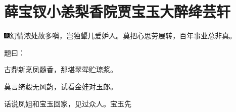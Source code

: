 

\chapter{薛宝钗小恙梨香院\hspace{.5em}贾宝玉大醉绛芸轩}
{\includegraphics[width=3mm]{../Images/00005}\kaishu 幻情浓处故多嗔，岂独颦儿爱妒人。莫把心思劳展转，百年事业总非真。}

题曰：

古鼎新烹凤髓香，那堪翠斝贮琼浆。

莫言绮縠无风韵，试看金娃对玉郎。

话说凤姐和宝玉回家，见过众人。宝玉先